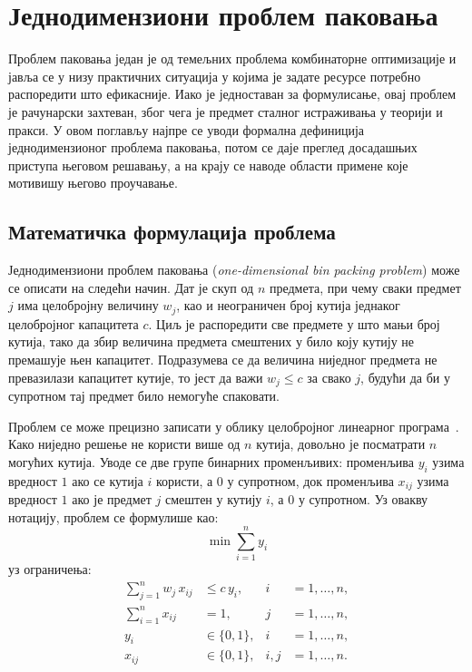 \chapter{Једнодимензиони проблем паковања}

Проблем паковања један је од темељних проблема комбинаторне оптимизације и јавља се у
низу практичних ситуација у којима је задате ресурсе потребно распоредити што
ефикасније. Иако је једноставан за формулисање, овај проблем је рачунарски захтеван,
због чега је предмет сталног истраживања у теорији и пракси. У овом поглављу најпре се
уводи формална дефиниција једнодимензионог проблема паковања, потом се даје преглед
досадашњих приступа његовом решавању, а на крају се наводе области примене које мотивишу
његово проучавање.

\section{Математичка формулација проблема}

Једнодимензиони проблем паковања (\foreignlanguage{english}{\emph{one-dimensional bin
packing problem}}) може се описати на следећи начин. Дат је скуп од $n$ предмета, при
чему сваки предмет $j$ има целобројну величину $w_j$, као и неограничен број кутија
једнаког целобројног капацитета $c$. Циљ је распоредити све предмете у што мањи број
кутија, тако да збир величина предмета смештених у било коју кутију не премашује њен
капацитет. Подразумева се да величина ниједног предмета не превазилази капацитет кутије,
то јест да важи $w_j \le c$ за свако $j$, будући да би у супротном тај предмет било
немогуће спаковати.

Проблем се може прецизно записати у облику целобројног линеарног
програма~\cite{martello1990}. Како ниједно решење не користи више од $n$ кутија, довољно
је посматрати $n$ могућих кутија. Уводе се две групе бинарних променљивих: променљива
$y_i$ узима вредност $1$ ако се кутија $i$ користи, а $0$ у супротном, док променљива
$x_{ij}$ узима вредност $1$ ако је предмет $j$ смештен у кутију $i$, а $0$ у супротном.
Уз овакву нотацију, проблем се формулише као:
\[
  \min \sum_{i=1}^{n} y_i
\]
уз ограничења:
\begin{align*}
  \sum_{j=1}^{n} w_j\, x_{ij} &\le c\, y_i, & i   &= 1,\dots,n,\\
  \sum_{i=1}^{n} x_{ij}       &= 1,         & j   &= 1,\dots,n,\\
  y_i                         &\in \{0,1\}, & i   &= 1,\dots,n,\\
  x_{ij}                      &\in \{0,1\}, & i,j &= 1,\dots,n.
\end{align*}


